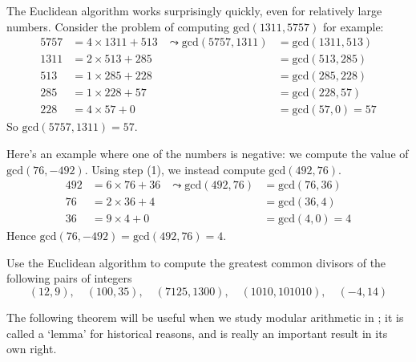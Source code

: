 \begin{example} \label{exGCD13115757}
The Euclidean algorithm works surprisingly quickly, even for relatively large numbers. Consider the problem of computing $\mathrm{gcd}(1311, 5757)$ for example:
\begin{align*}
5757 &= 4 \times 1311 + 513 &\leadsto \mathrm{gcd}(5757,1311) &= \mathrm{gcd}(1311,513)  \\
1311 &= 2 \times 513 + 285 &&= \mathrm{gcd}(513,285) \\
513 &= 1 \times 285 + 228 &&= \mathrm{gcd}(285,228) \\
285 &= 1 \times 228 + 57 &&= \mathrm{gcd}(228, 57) \\
228 &= 4 \times 57 + 0 &&= \mathrm{gcd}(57,0) = 57
\end{align*}
So $\mathrm{gcd}(5757,1311) = 57$.
\end{example}

\begin{example}
Here's an example where one of the numbers is negative: we compute the value of $\mathrm{gcd}(76, -492)$. Using step (1), we instead compute $\mathrm{gcd}(492, 76)$.
\begin{align*}
492 &= 6 \times 76 + 36 &\leadsto \mathrm{gcd}(492,76) &= \mathrm{gcd}(76,36) \\
76 &= 2 \times 36 + 4 &&= \mathrm{gcd}(36,4) \\
36 &= 9 \times 4 + 0 &&= \mathrm{gcd}(4,0) = 4
\end{align*}
Hence $\mathrm{gcd}(76, -492) = \mathrm{gcd}(492,76) = 4$.
\end{example}

\begin{example}
\label{exGCDsofPairs}
Use the Euclidean algorithm to compute the greatest common divisors of the following pairs of integers
\[ (12, 9), \quad (100, 35), \quad (7125, 1300), \quad (1010, 101010), \quad (-4, 14) \]
\end{example}

The following theorem will be useful when we study modular arithmetic in ; it is called a `lemma' for historical reasons, and is really an important result in its own right.

